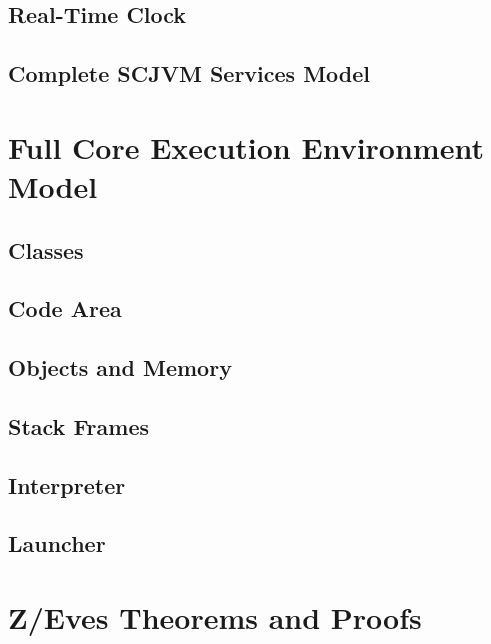 \documentclass[a4paper,10pt]{report}
\begin{document}
\section{Real-Time Clock}


\section{Complete SCJVM Services Model}


\chapter{Full Core Execution Environment Model}
\label{full-cee-model}

\section{Classes}


\section{Code Area}


\section{Objects and Memory}


\section{Stack Frames}


\section{Interpreter}


\section{Launcher}



\chapter{Z/Eves Theorems and Proofs}
\label{zeves-proofs}
\end{document}
